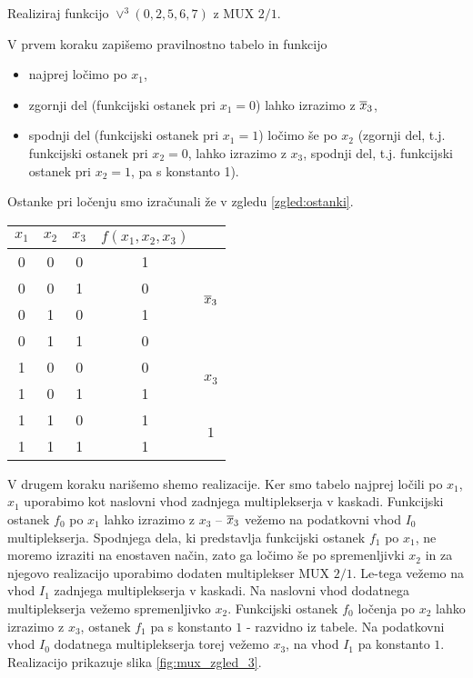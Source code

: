 \begin{zgled}

Realiziraj funkcijo $\vee^3(0,2,5,6,7)$ z MUX $2/1$.\\

\end{zgled}
\begin{resitev}

V prvem koraku zapišemo pravilnostno tabelo in funkcijo
\begin{itemize}
\item najprej ločimo po $x_1$,
\item zgornji del (funkcijski ostanek pri $x_1=0$) lahko izrazimo z $\overline x_3$,
\item spodnji del (funkcijski ostanek pri $x_1=1$) ločimo še po $x_2$ (zgornji del, t.j. funkcijski ostanek pri $x_2 = 0$, lahko izrazimo z $x_3$, spodnji del, t.j. funkcijski ostanek pri $x_2 = 1$, pa s konstanto 1).
\end{itemize}

\bigskip

Ostanke pri ločenju smo izračunali že v zgledu \ref{zgled:ostanki}.

\begin{center}
\begin{tabular}{ccc|cc}
$x_1$ & $x_2$ & $x_3$ &  $f(x_1,x_2,x_3)$ \\
\hline
0 & 0 & 0 & 1 & \multirow{4}{*}{$\overline x_3$}\\
0 & 0 & 1 & 0 &\\ 
0 & 1 & 0 & 1 &\\
0 & 1 & 1 & 0 &\\
\hline
1 & 0 & 0 & 0 & \multirow{2}{*}{$x_3$}\\
1 & 0 & 1 & 1 &\\
\hline
1 & 1 & 0 & 1 & \multirow{2}{*}{$1$}\\
1 & 1 & 1 & 1 &\\
\end{tabular}
\end{center}

\bigskip

V drugem koraku narišemo shemo realizacije. Ker smo tabelo najprej ločili po $x_1$, $x_1$ uporabimo kot naslovni vhod zadnjega multiplekserja v kaskadi. Funkcijski ostanek $f_0$ po $x_1$ lahko izrazimo z $x_3$ -- $\overline x_3$ vežemo na podatkovni vhod $I_0$ multiplekserja. Spodnjega dela, ki predstavlja funkcijski ostanek $f_1$ po $x_1$, ne moremo izraziti na enostaven način, zato ga ločimo še po spremenljivki $x_2$ in za njegovo realizacijo uporabimo dodaten multiplekser MUX $2/1$. Le-tega vežemo na vhod $I_1$ zadnjega multiplekserja v kaskadi. Na naslovni vhod dodatnega multiplekserja vežemo spremenljivko $x_2$. Funkcijski ostanek $f_0$ ločenja po $x_2$ lahko izrazimo z $x_3$, ostanek $f_1$ pa s konstanto $1$ - razvidno iz tabele. Na podatkovni vhod $I_0$ dodatnega multiplekserja torej vežemo $x_3$, na vhod $I_1$ pa konstanto $1$. Realizacijo prikazuje slika \ref{fig:mux_zgled_3}.


\end{resitev}
